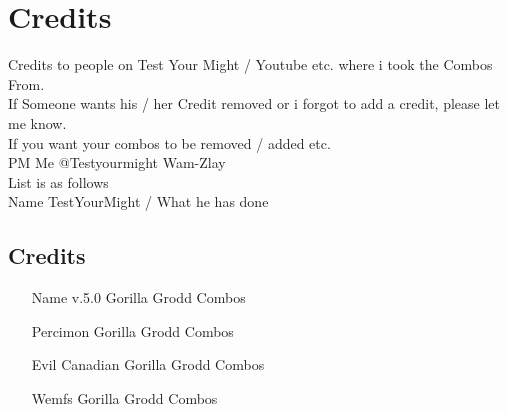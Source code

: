 \documentclass[main.tex]{subfiles}
\begin{document}
\chapter{Credits}

Credits to people on Test Your Might / Youtube etc. where i took the Combos From.\\If Someone wants his / her Credit removed or i forgot to add a credit, please let me know.\\
If you want your combos to be removed / added etc.\\
PM Me @Testyourmight Wam-Zlay\\

List is as follows\\

Name TestYourMight / What he has done\\

\section{Credits}

\begin{itemize}
\item [Name v.5.0] Gorilla Grodd Combos 
\item [Percimon] Gorilla Grodd Combos
\item [Evil Canadian] Gorilla Grodd Combos
\item [Wemfs] Gorilla Grodd Combos
\end{itemize}
\end{document}
